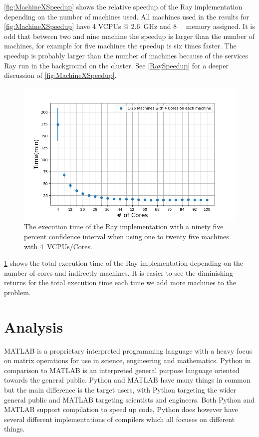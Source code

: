 \documentclass[12pt, a4paper]{article}
\begin{document}
\cref{fig:MachineXSpeedup} shows the relative speedup of the Ray implementation depending on the number of machines used.
All machines used in the results for \cref{fig:MachineXSpeedup} have 4 VCPUs @ \SI{2.6}{\giga\hertz} and \SI{8}{\giga\byte} memory assigned.
It is odd that between two and nine machine the speedup is larger than the number of machines, for example for five machines the speedup is six times faster.
The speedup is probably larger than the number of machines because of the services Ray run in the background on the cluster.
See \cref{RaySpeedup} for a deeper discussion of \cref{fig:MachineXSpeedup}.

\begin{figure}[H]
    \centering
    \includegraphics[width=1.0\textwidth, ]{pictures/CoresXTimeMinutesWhite.png}
    \caption{The execution time of the Ray implementation with a ninety five percent confidence interval when using one to twenty five machines with \SI{4}{VCPUs/Cores}.}
    \label{fig:CoresXTime}
\end{figure}

\cref{fig:CoresXTime} shows the total execution time of the Ray implementation depending on the number of cores and indirectly machines.
It is easier to see the diminishing returns for the total execution time each time we add more machines to the problem.


\section{Analysis}

MATLAB is a proprietary interpreted programming language with a heavy focus on matrix operations for use in science, engineering and mathematics.
Python in comparison to MATLAB is an interpreted general purpose language oriented towards the general public.
Python and MATLAB have many things in common but the main difference is the target users, with Python targeting the wider general public and MATLAB targeting scientists and engineers.
Both Python and MATLAB support compilation to speed up code, Python does however have several different implementations of compilers which all focuses on different things.
\end{document}

